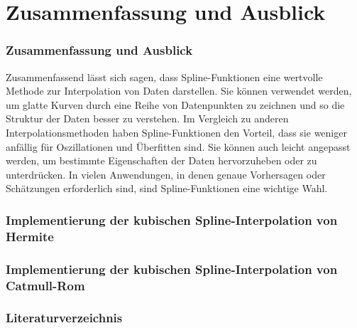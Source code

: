 {			\section{Zusammenfassung und Ausblick}
		
		\begin{frame}
			\frametitle{Zusammenfassung und Ausblick}
			Zusammenfassend lässt sich sagen, dass Spline-Funktionen eine wertvolle Methode zur Interpolation von Daten darstellen. Sie können verwendet werden, um glatte Kurven durch eine Reihe von Datenpunkten zu zeichnen und so die Struktur der Daten besser zu verstehen. Im Vergleich zu anderen Interpolationsmethoden haben Spline-Funktionen den Vorteil, dass sie weniger anfällig für Oszillationen und Überfitten sind. Sie können auch leicht angepasst werden, um bestimmte Eigenschaften der Daten hervorzuheben oder zu unterdrücken. In vielen Anwendungen, in denen genaue Vorhersagen oder Schätzungen erforderlich sind, sind Spline-Funktionen eine wichtige Wahl.	
		\end{frame} 
	
		\appendix{}
		
		\begin{frame}
			\frametitle{Implementierung der kubischen Spline-Interpolation von Hermite}
			
			
			
		\end{frame}
		\mode* 
		
		\begin{frame}
			\frametitle{Implementierung der kubischen Spline-Interpolation von Catmull-Rom}
			
			
			
		\end{frame}
		\mode* 
		
		
		\backmatter                     %
		
		\begin{frame}
			\frametitle{Literaturverzeichnis}
			
			\printbibliography
		\end{frame}
	
	
}	
		
	

